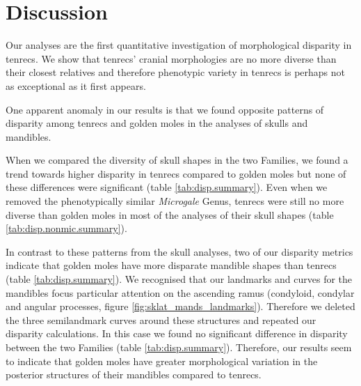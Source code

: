 \documentclass[12pt,a4paper]{article}
\begin{document}
\section{Discussion} 


	Our analyses are the first quantitative investigation of morphological disparity in tenrecs. We show that tenrecs' cranial morphologies are no more diverse than their closest relatives and therefore phenotypic variety in tenrecs is perhaps not as exceptional as it first appears.
	
	One apparent anomaly in our results is that we found opposite patterns of disparity among tenrecs and golden moles in the analyses of skulls and mandibles.
	
	When we compared the diversity of skull shapes in the two Families, we found a trend towards higher disparity in tenrecs compared to golden moles but none of these differences were significant (table \ref{tab:disp.summary}). Even when we removed the phenotypically similar \textit{Microgale} Genus, tenrecs were still no more diverse than golden moles in most of the analyses of their skull shapes (table \ref{tab:disp.nonmic.summary}). 
	
	In contrast to these patterns from the skull analyses, two of our disparity metrics indicate that golden moles have more disparate mandible shapes than tenrecs (table \ref{tab:disp.summary}).
	We recognised that our landmarks and curves for the mandibles focus particular attention on the ascending ramus (condyloid, condylar and angular processes, figure \ref{fig:sklat_mands_landmarks}). Therefore we deleted the three semilandmark curves around these structures and repeated our disparity calculations. In this case we found no significant difference in disparity between the two Families (table \ref{tab:disp.summary}). Therefore, our results seem to indicate that golden moles have greater morphological variation in the posterior structures of their mandibles compared to tenrecs.
		
\end{document}
